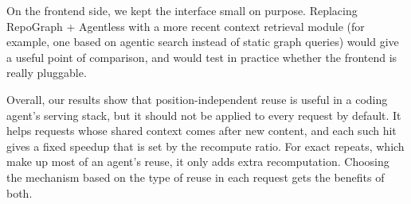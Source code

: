On the frontend side, we kept the interface small on purpose. Replacing RepoGraph + Agentless with a more recent context retrieval module (for example, one based on agentic search instead of static graph queries) would give a useful point of comparison, and would test in practice whether the frontend is really pluggable.

Overall, our results show that position-independent reuse is useful in a coding agent's serving stack, but it should not be applied to every request by default. It helps requests whose shared context comes after new content, and each such hit gives a fixed speedup that is set by the recompute ratio. For exact repeats, which make up most of an agent's reuse, it only adds extra recomputation. Choosing the mechanism based on the type of reuse in each request gets the benefits of both.
